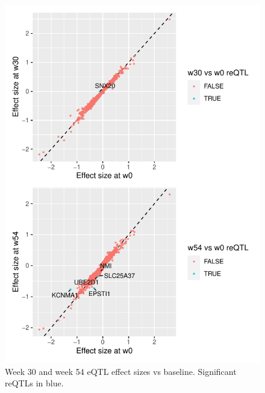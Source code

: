 \begin{outline}
\begin{figure}
    \centering
    \includegraphics[width=1.0\textwidth,page=1]{mainmatter/figures/chapter_04/plot_dge_eqtl.pm_w30_vs_w0_and_w54_vs_w0}
    \caption{Week 30 and week 54 eQTL effect sizes vs baseline. Significant reQTLs in blue.}
    \label{fig:multipants_reQTL_pm_w30_vs_w0_and_w54_vs_w0}
\end{figure}



\end{outline}
